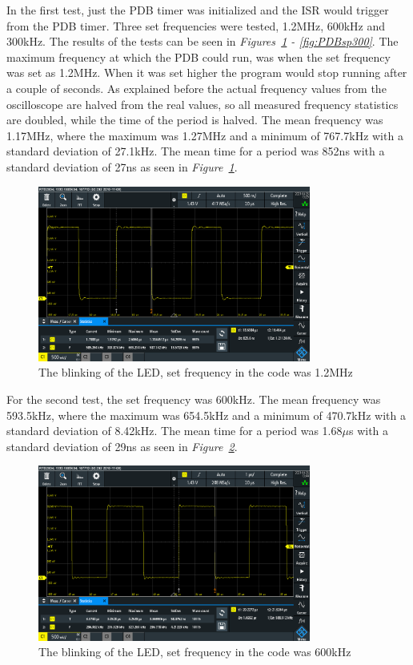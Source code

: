 In the first test, just the PDB timer was initialized and the ISR would trigger from the PDB timer.
Three set frequencies were tested, 1.2MHz, 600kHz and 300kHz.
The results of the tests can be seen in \textit{Figures~\ref{fig:PDBSp1200} - \ref{fig:PDBsp300}}.
The maximum frequency at which the PDB could run, was when the set frequency was set as 1.2MHz.
When it was set higher the program would stop running after a couple of seconds.
As explained before the actual frequency values from the oscilloscope are halved from the real values, so all measured frequency statistics are doubled, while the time of the period is halved.
The mean frequency was 1.17MHz, where the maximum was 1.27MHz and a minimum of 767.7kHz with a standard deviation of 27.1kHz. 
The mean time for a period was 852ns with a standard deviation of 27ns as seen in \textit{Figure~\ref{fig:PDBSp1200}}.

\clearpage

\begin{figure}[h]
    \centering
    \includegraphics[width=0.8\textwidth]{graphics/STAT01_1200.PNG}
    \caption{The blinking of the LED, set frequency in the code was 1.2MHz}
    \label{fig:PDBSp1200}
\end{figure}

For the second test, the set frequency was 600kHz.
The mean frequency was 593.5kHz, where the maximum was 654.5kHz and a minimum of 470.7kHz with a standard deviation of 8.42kHz. 
The mean time for a period was 1.68$\mu$s with a standard deviation of 29ns as seen in \textit{Figure~\ref{fig:PDBSp600}}.

\begin{figure}[h]
    \centering
    \includegraphics[width=0.8\textwidth]{graphics/STAT02_600.PNG}
    \caption{The blinking of the LED, set frequency in the code was 600kHz}
    \label{fig:PDBSp600}
\end{figure}

